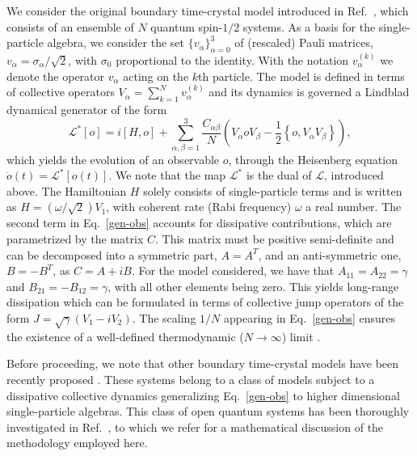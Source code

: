 \documentclass[prl,superscriptaddress,showpacs,longbibliography,reprint]{revtex4-2}
\begin{document}
 We consider the original boundary time-crystal model introduced in Ref.~\cite{iemini2018}, which consists of an ensemble of $N$ quantum spin-$1/2$ systems. As a basis for the single-particle algebra, we consider the set $\{v_\alpha\}_{\alpha=0}^{3}$ of (rescaled) Pauli matrices, $v_\alpha=\sigma_{\alpha}/\sqrt{2}$, with $\sigma_0$ proportional to the identity. With the notation $v_\alpha^{(k)}$ we denote the operator $v_\alpha$ acting on the $k$th particle. The model is defined in terms of collective operators $V_\alpha=\sum_{k=1}^N v_\alpha^{(k)}$ and its dynamics is governed a Lindblad dynamical generator \cite{lindblad1976} of the form \cite{iemini2018}
\begin{equation}
\mathcal{L}^*[o]=i[H,o]+\!\!\sum_{\alpha,\beta=1}^{3} \!\!\frac{C_{\alpha\beta}}{N}\! \left(V_\alpha o V_\beta-\frac{1}{2}\left\{o,V_\alpha V_\beta \right\}\right) ,
 \label{gen-obs}   
\end{equation}
which yields the evolution of an observable $o$, through the Heisenberg equation  $\dot{o}(t)=\mathcal{L}^*[o(t)]$. We note that the map $\mathcal{L}^*$ is the dual of $\mathcal{L}$, introduced above. The Hamiltonian $H$ solely consists of single-particle terms and is written as $H=(\omega/\sqrt{2})V_1$, with coherent rate (Rabi frequency) $\omega$ a real number. The second term in Eq.~\eqref{gen-obs} accounts for dissipative contributions, which are parametrized by the matrix $C$. This matrix must be positive semi-definite and can be decomposed into a symmetric part, $A=A^T$, and an anti-symmetric one, $B=-B^T$, as $C=A+iB$. For the model considered, we have that $A_{11}=A_{22}=\gamma$ and $B_{21}=-B_{12}=\gamma$, with all other elements being zero. This yields long-range dissipation which can be formulated in terms of collective jump operators of the form $J=\sqrt{\gamma}(V_1-iV_2)$. The scaling $1/N$ appearing in Eq.~\eqref{gen-obs} ensures the existence of a well-defined thermodynamic ($N\to\infty$) limit \cite{benatti2018}.

Before proceeding, we note that other boundary time-crystal models have been recently proposed \cite{iemini2021,piccitto2021}. These systems belong to a class of models subject to a dissipative collective dynamics generalizing Eq.~\eqref{gen-obs} to higher dimensional single-particle algebras. This class of open quantum systems has been thoroughly investigated in Ref.~\cite{benatti2018}, to which we refer for a  mathematical discussion of the methodology employed here. 
\vspace{10pt}
\end{document}
